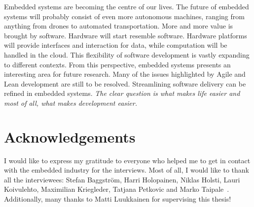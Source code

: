 \documentclass[english]{tktltiki2}
\begin{document}
Embedded systems are becoming the centre of our lives. The future of embedded systems will probably consist of even more autonomous machines, ranging from anything from drones to automated transportation. More and more value is brought by software. Hardware will start resemble software. Hardware platforms will provide interfaces and interaction for data, while computation will be handled in the cloud. This flexibility of software development is vastly expanding to different contexts. From this perspective, embedded systems presents an interesting area for future research. Many of the issues highlighted by Agile and Lean development are still to be resolved. Streamlining software delivery can be refined in embedded systems. \emph{The clear question is what makes life easier and most of all, what makes development easier.}


\section{Acknowledgements}

I would like to express my gratitude to everyone who helped me to get in contact with the embedded industry for the interviews. Most of all, I would like to thank all the interviewees: Stefan Baggström, Harri Holopainen, Niklas Holsti, Lauri Koivulehto, Maximilian Kriegleder, Tatjana Petkovic and Marko Taipale~\cite{BT15, Hol15a, Hol15b, Koi15, Kri15, Pet15}. Additionally, many thanks to Matti Luukkainen for supervising this thesis!




\end{document}
